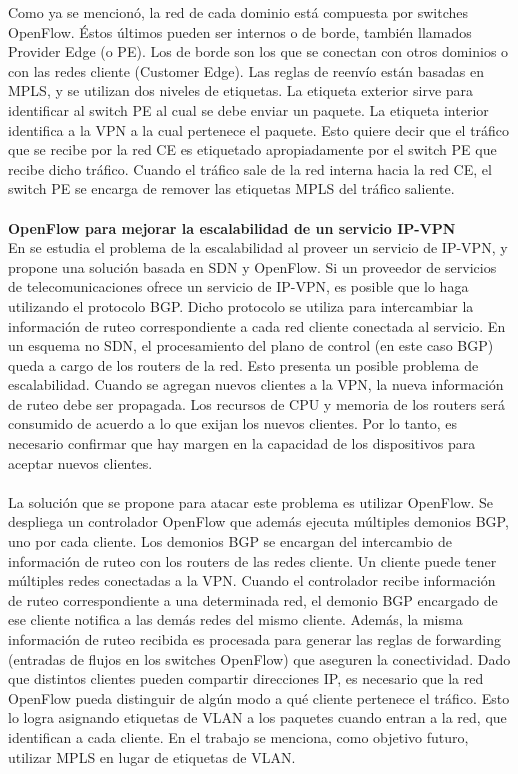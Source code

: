 Como ya se mencionó, la red de cada dominio está compuesta por switches OpenFlow. Éstos últimos pueden ser internos o de borde, también llamados Provider Edge (o PE). Los de borde son los que se conectan con otros dominios o con las redes cliente (Customer Edge). Las reglas de reenvío están basadas en MPLS, y se utilizan dos niveles de etiquetas. La etiqueta exterior sirve para identificar al switch PE al cual se debe enviar un paquete. La etiqueta interior identifica a la VPN a la cual pertenece el paquete. Esto quiere decir que el tráfico que se recibe por la red CE es etiquetado apropiadamente por el switch PE que recibe dicho tráfico. Cuando el tráfico sale de la red interna hacia la red CE, el switch PE se encarga de remover las etiquetas MPLS del tráfico saliente. \\ \\
\textbf{OpenFlow para mejorar la escalabilidad de un servicio IP-VPN} \\
En \cite{ip-vpn-bgp-sdn} se estudia el problema de la escalabilidad al proveer un servicio de IP-VPN, y propone una solución basada en SDN y OpenFlow. Si un proveedor de servicios de telecomunicaciones ofrece un servicio de IP-VPN, es posible que lo haga utilizando el protocolo BGP. Dicho protocolo se utiliza para intercambiar la información de ruteo correspondiente a cada red cliente conectada al servicio. En un esquema no SDN, el procesamiento del plano de control (en este caso BGP) queda a cargo de los routers de la red. Esto presenta un posible problema de escalabilidad. Cuando se agregan nuevos clientes a la VPN, la nueva información de ruteo debe ser propagada. Los recursos de CPU y memoria de los routers será consumido de acuerdo a lo que exijan los nuevos clientes. Por lo tanto, es necesario confirmar que hay margen en la capacidad de los dispositivos para aceptar nuevos clientes. \\ \\
La solución que se propone para atacar este problema es utilizar OpenFlow. Se despliega un controlador OpenFlow que además ejecuta múltiples demonios BGP, uno por cada cliente. Los demonios BGP se encargan del intercambio de información de ruteo con los routers de las redes cliente. Un cliente puede tener múltiples redes conectadas a la VPN. Cuando el controlador recibe información de ruteo correspondiente a una determinada red, el demonio BGP encargado de ese cliente notifica a las demás redes del mismo cliente. Además, la misma información de ruteo recibida es procesada para generar las reglas de forwarding (entradas de flujos en los switches OpenFlow) que aseguren la conectividad. Dado que distintos clientes pueden compartir direcciones IP, es necesario que la red OpenFlow pueda distinguir de algún modo a qué cliente pertenece el tráfico. Esto lo logra asignando etiquetas de VLAN a los paquetes cuando entran a la red, que identifican a cada cliente. En el trabajo se menciona, como objetivo futuro, utilizar MPLS en lugar de etiquetas de VLAN. \\ \\
